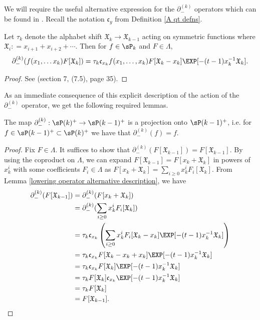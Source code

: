 We will require the useful alternative expression for the $\partial_{-}^{(k)}$ operators which can be found in \cite{Ion_2022}. Recall the notation $\mathfrak{c}_{y}$ from Definition \ref{A qt defns}.

\begin{lemm}\label{lowering operator alternative description}
Let $\tau_k$ denote the alphabet shift $\mathfrak{X}_k \rightarrow \mathfrak{X}_{k-1}$ acting on symmetric functions where $\mathfrak{X}_i : = x_{i+1}+x_{i+2}+ \cdots$. Then for $f \in \sP_{k}$ and $F \in \Lambda,$
$$ \partial_{-}^{(k)}(f(x_1,\ldots x_k) F[\mathfrak{X}_k]) = \tau_k \mathfrak{c}_{x_k} f(x_1,\ldots,x_k)F[\mathfrak{X}_k -x_k]\EXP[-(t-1)x_k^{-1}\mathfrak{X}_{k}].$$
\end{lemm}

\begin{proof}
See \cite{Ion_2022} (section 7, (7.5), page 35).
\end{proof}

As an immediate consequence of this explicit description of the action of the $\partial_{-}^{(k)}$ operator, we get the following required lemmas.

\begin{lemm} \label{lowering is a projection}
The map $\partial_{-}^{(k)}: \sP(k)^{+} \rightarrow \sP(k-1)^{+}$ is a projection onto $\sP(k-1)^{+}$, i.e. for $f \in \sP(k-1)^{+}\subset \sP(k)^{+}$ we have that $\partial_{-}^{(k)}(f) = f$.
\end{lemm}
\begin{proof}
    Fix $F \in \Lambda.$ It suffices to show that $\partial_{-}^{(k)}(F[\mathfrak{X}_{k-1}]) = F[\mathfrak{X}_{k-1}].$ By using the coproduct on $\Lambda$, we can expand $F[\mathfrak{X}_{k-1}] = F[x_k+\mathfrak{X}_{k}]$ in powers of $x_k^{i}$ with some coefficients $F_i \in \Lambda$ as $F[x_k+\mathfrak{X}_{k}] = \sum_{i \geq 0} x_k^{i}F_{i}[\mathfrak{X}_{k}].$ From Lemma \ref{lowering operator alternative description}, we have 
    \begin{align*}
        \partial_{-}^{(k)}(F[\mathfrak{X}_{k-1}]) &= \partial_{-}^{(k)}(F[x_{k}+\mathfrak{X}_{k}])\\
        &= \partial_{-}^{(k)}(\sum_{i \geq 0} x_k^{i}F_{i}[\mathfrak{X}_{k}]) \\
        &= \tau_k \mathfrak{c}_{x_k} \left( \sum_{i \geq 0} x_k^{i}F_i[\mathfrak{X}_k -x_k]\EXP[-(t-1)x_k^{-1}\mathfrak{X}_{k}] \right) \\
        &= \tau_k \mathfrak{c}_{x_k} F[\mathfrak{X}_k -x_k +x_k]\EXP[-(t-1)x_k^{-1}\mathfrak{X}_{k}] \\
        &= \tau_k \mathfrak{c}_{x_k} F[\mathfrak{X}_k] \EXP[-(t-1)x_k^{-1}\mathfrak{X}_{k}] \\ 
        &= \tau_k F[\mathfrak{X}_k] \mathfrak{c}_{x_k} \EXP[-(t-1)x_k^{-1}\mathfrak{X}_{k}] \\ 
        &= \tau_k F[\mathfrak{X}_k] \\
        &= F[\mathfrak{X}_{k-1}]. \qedhere
    \end{align*}
    
    
\end{proof}

